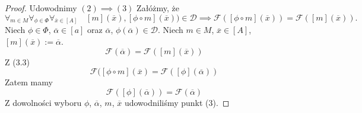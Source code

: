 \documentclass[12pt,a4paper]{report}
\newcommand{\domkniecie}[1]{\left\lbrack{#1}\right\rbrack}
\begin{document}
\begin{proof}
Udowodnimy $(2) \implies (3)$
Załóżmy, że
\begin{equation}
\forall_{m \in M}\forall_{\phi \in \Phi} \forall_{\overline{x} \in \domkniecie{A}} \quad \domkniecie{m}(\overline{x}),\domkniecie{\phi\circ m}(\overline{x})) \in \mathcal{D} \implies \mathcal{F}( \domkniecie{\phi \circ m}(\overline{x}))=\mathcal{F}(\domkniecie{m}(\overline{x})).
\end{equation}
Niech $\phi \in \Phi$, $\overline{\alpha} \in \domkniecie{a}$ oraz $\overline{\alpha}$, $\phi(\overline{\alpha})\in \mathcal{D}$. Niech $m \in M$, $\overline{x} \in \domkniecie{A}$, $\domkniecie{m}(\overline{x}):= \overline{\alpha}$. 
$$
 \mathcal{F}(\overline{\alpha})=\mathcal{F}(\domkniecie{m}(\overline{x}))
$$
Z (3.3)
$$
\mathcal{F}(\domkniecie{\phi \circ m}(\overline{x})=\mathcal{F}(\domkniecie{\phi}(\overline{\alpha}))
$$
Zatem mamy
$$
\mathcal{F}(\domkniecie{\phi}(\overline{\alpha}))=\mathcal{F}(\overline{\alpha})
$$
Z dowolności wyboru $\phi$, $\overline{\alpha}$, $m$, $\overline{x}$ udowodniliśmy punkt (3).
\end{proof}
\end{document}
